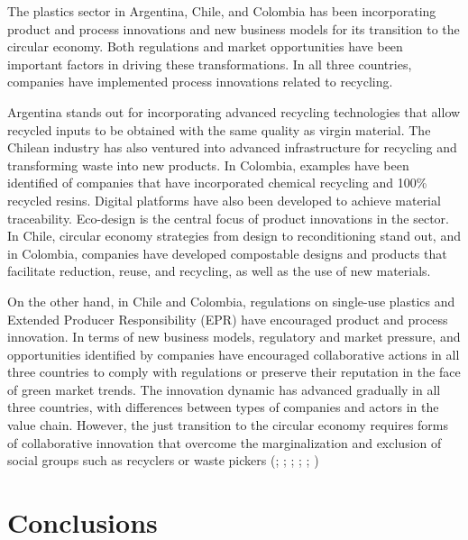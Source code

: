 \documentclass[
  12pt,
  oneside]{book}
\begin{document}
The plastics sector in Argentina, Chile, and Colombia has been
incorporating product and process innovations and new business models
for its transition to the circular economy. Both regulations and market
opportunities have been important factors in driving these
transformations. In all three countries, companies have implemented
process innovations related to recycling.

Argentina stands out for incorporating advanced recycling technologies
that allow recycled inputs to be obtained with the same quality as
virgin material. The Chilean industry has also ventured into advanced
infrastructure for recycling and transforming waste into new products.
In Colombia, examples have been identified of companies that have
incorporated chemical recycling and 100\% recycled resins. Digital
platforms have also been developed to achieve material traceability.
Eco-design is the central focus of product innovations in the sector. In
Chile, circular economy strategies from design to reconditioning stand
out, and in Colombia, companies have developed compostable designs and
products that facilitate reduction, reuse, and recycling, as well as the
use of new materials.

On the other hand, in Chile and Colombia, regulations on single-use
plastics and Extended Producer Responsibility (EPR) have encouraged
product and process innovation. In terms of new business models,
regulatory and market pressure, and opportunities identified by
companies have encouraged collaborative actions in all three countries
to comply with regulations or preserve their reputation in the face of
green market trends. The innovation dynamic has advanced gradually in
all three countries, with differences between types of companies and
actors in the value chain. However, the just transition to the circular
economy requires forms of collaborative innovation that overcome the
marginalization and exclusion of social groups such as recyclers or
waste pickers (;
;
;
;
;
)

\chapter{Conclusions}\label{conclusions}
\end{document}
